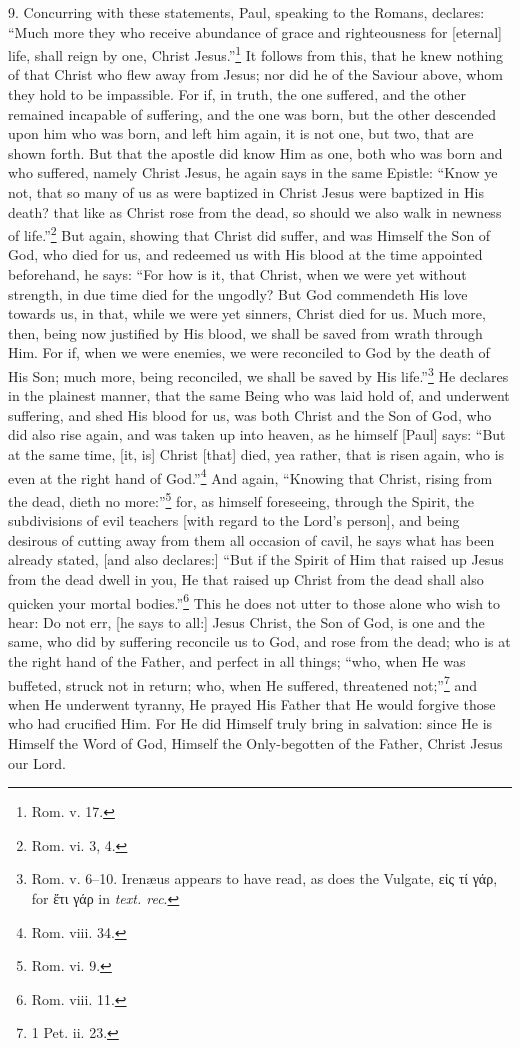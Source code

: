 9. Concurring with these statements, Paul, speaking to the Romans, declares: “Much more they who receive abundance of grace and righteousness for [eternal] life, shall reign by one, Christ Jesus.”\footnote{Rom. v. 17.} It follows from this, that he knew nothing of that Christ who flew away from Jesus; nor did he of the Saviour above, whom they hold to be impassible. For if, in  truth, the one suffered, and the other remained incapable of suffering, and the one was born, but the other descended upon him who was born, and left him again, it is not one, but two, that are shown forth. But that the apostle did know Him as one, both who was born and who suffered, namely Christ Jesus, he again says in the same Epistle: “Know ye not, that so many of us as were baptized in Christ Jesus were baptized in His death? that like as Christ rose from the dead, so should we also walk in newness of life.”\footnote{Rom. vi. 3, 4.} But again, showing that Christ did suffer, and was Himself the Son of God, who died for us, and redeemed us with His blood at the time appointed beforehand, he says: “For how is it, that Christ, when we were yet without strength, in due time died for the ungodly? But God commendeth His love towards us, in that, while we were yet sinners, Christ died for us. Much more, then, being now justified by His blood, we shall be saved from wrath through Him. For if, when we were enemies, we were reconciled to God by the death of His Son; much more, being reconciled, we shall be saved by His life.”\footnote{Rom. v. 6–10. Irenæus appears to have read, as does the Vulgate, \textgreek{εἰς τί γάρ}, for \textgreek{ἔτι γάρ} in \emph{text. rec}.} He declares in the plainest manner, that the same Being who was laid hold of, and underwent suffering, and shed His blood for us, was both Christ and the Son of God, who did also rise again, and was taken up into heaven, as he himself [Paul] says: “But at the same time, [it, is] Christ [that] died, yea rather, that is risen again, who is even at the right hand of God.”\footnote{Rom. viii. 34.} And again, “Knowing that Christ, rising from the dead, dieth no more:”\footnote{Rom. vi. 9.} for, as himself foreseeing, through the Spirit, the subdivisions of evil teachers [with regard to the Lord’s person], and being desirous of cutting away from them all occasion of cavil, he says what has been already stated, [and also declares:] “But if the Spirit of Him that raised up Jesus from the dead dwell in you, He that raised up Christ from the dead shall also quicken your mortal bodies.”\footnote{Rom. viii. 11.} This he does not utter to those alone who wish to hear: Do not err, [he says to all:] Jesus Christ, the Son of God, is one and the same, who did by suffering reconcile us to God, and rose from the dead; who is at the right hand of the Father, and perfect in all things; “who, when He was buffeted, struck not in return; who, when He suffered, threatened not;”\footnote{1 Pet. ii. 23.} and when He underwent tyranny, He prayed His Father that He would forgive those who had crucified Him. For He did Himself truly bring in salvation: since He is Himself the Word of God, Himself the Only-begotten of the Father, Christ Jesus our Lord.

